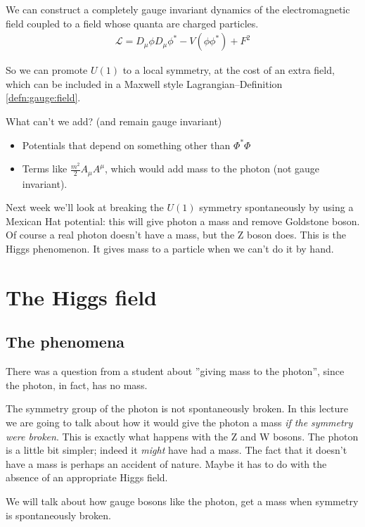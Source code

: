 \documentclass[]{article}
\begin{document}
We can construct a completely gauge invariant dynamics of the electromagnetic field coupled to a field whose quanta are charged particles.
\begin{align*}
	\mathcal{L} = D_\mu \phi D_\mu \phi^* -V(\phi\phi^*) + F^2
\end{align*}

So we can promote $U(1)$ to a local symmetry, at the cost of an extra field, which can be included in a Maxwell style Lagrangian--Definition \ref{defn:gauge:field}.

What can't we add? (and remain gauge invariant)

\begin{itemize}
	\item Potentials that depend on something other than $\Phi^*\Phi$ 
	\item Terms like $\frac{m^2}{2}A_\mu A^\mu$, which would add mass to the photon (not gauge invariant).
\end{itemize}

Next week we'll look at breaking the $U(1)$ symmetry spontaneously by using a Mexican Hat potential: this will give photon a mass and remove Goldstone boson. Of course a real photon doesn't have a mass, but the Z boson does. This is the Higgs phenomenon. It gives mass to a particle when we can't do it by hand.

\section{The Higgs field}

\subsection{The phenomena}

There was a question from a student about ''giving mass to the photon'', since the photon, in fact, has no mass.

The symmetry group of the photon is not spontaneously broken. In this lecture we are going to talk about how it would give the photon a mass \emph{if the symmetry were broken}. This is exactly what happens with the Z and  W bosons. The photon is a little bit simpler; indeed it \emph{might} have had a mass. The fact that it doesn't have a mass is perhaps an accident of nature. Maybe it has to do with the absence of an appropriate Higgs field.

We will talk about how gauge bosons like the photon, get a mass when symmetry is spontaneously broken.
\end{document}
